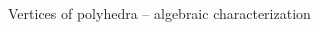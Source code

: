\begin{frame}{Vertices of polyhedra -- algebraic characterization}
{\begin{columns}
\begin{column}{.5\textwidth}


    \end{column}       
  \end{columns}}



  
  \begin{columns}
    \begin{column}{.5\textwidth}
      
    \end{column}
    \begin{column}{.5\textwidth}
      
    \end{column}       
  \end{columns}
\end{frame}





\begin{frame}  
  \begin{columns}
    \begin{column}{.5\textwidth}
      
    \end{column}
    \begin{column}{.5\textwidth}
      
    \end{column}       
  \end{columns}
\end{frame}






